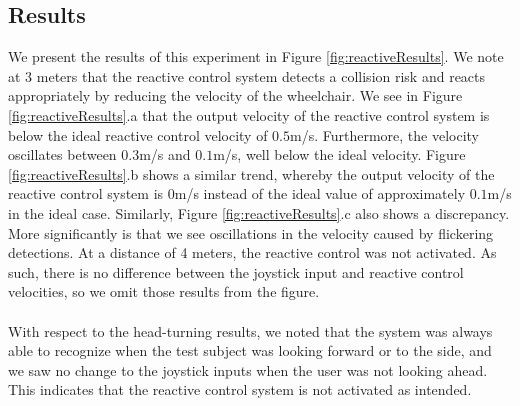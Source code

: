 \subsection{Results}
We present the results of this experiment in Figure \ref{fig:reactiveResults}. We note at $3$ meters that the reactive control system detects a collision risk and reacts appropriately by reducing the velocity of the wheelchair. We see in Figure \ref{fig:reactiveResults}.a that the output velocity of the reactive control system is below the ideal reactive control velocity of $0.5$m/s. Furthermore, the velocity oscillates between $0.3$m/s and $0.1$m/s, well below the ideal velocity. Figure \ref{fig:reactiveResults}.b shows a similar trend, whereby the output velocity of the reactive control system is $0$m/s instead of the ideal value of approximately $0.1$m/s in the ideal case. Similarly, Figure \ref{fig:reactiveResults}.c also shows a discrepancy. More significantly is that we see oscillations in the velocity caused by flickering detections. At a distance of 4 meters, the reactive control was not activated. As such, there is no difference between the joystick input and reactive control velocities, so we omit those results from the figure.

\paragraph{}With respect to the head-turning results, we noted that the system was always able to recognize when the test subject was looking forward or to the side, and we saw no change to the joystick inputs when the user was not looking ahead. This indicates that the reactive control system is not activated as intended.

